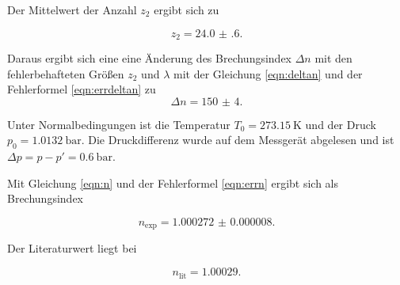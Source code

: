 

\noindent Der Mittelwert der Anzahl $z_2$ ergibt sich zu 

\begin{equation*}
    z_2 = \num{24.0(6)}.
\end{equation*}

\noindent Daraus ergibt sich eine eine Änderung des Brechungsindex $\Delta n$ mit den fehlerbehafteten Größen $z_2$ und $\lambda$ mit der Gleichung \eqref{eqn:deltan} und der Fehlerformel \eqref{eqn:errdeltan} zu 
\begin{equation*}
    \Delta n = \num{150(4)}.
\end{equation*}

\noindent Unter Normalbedingungen ist die Temperatur $T_0 = \SI{273.15}{\kelvin}$ und der Druck $ p_0 = \SI{1.0132}{\bar}.$ Die Druckdifferenz wurde auf dem Messgerät abgelesen und ist $\Delta p = p - p' = \SI{0.6}{\bar}$.

\noindent Mit Gleichung \eqref{eqn:n} und der Fehlerformel \eqref{eqn:errn} ergibt sich als Brechungsindex

\begin{equation*}
    n_\text{exp} = \num{1.000272(8)}.
\end{equation*}

\noindent Der Literaturwert \cite{Luft} liegt bei

\begin{equation*}
    n_\text{lit} = \num{1.00029}.
\end{equation*}

